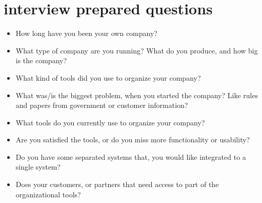 \section{interview prepared questions}

\begin{itemize}
  \item How long have you been your own company?
  \item What type of company are you running? What do you produce, and how big is the company? 
  \item What kind of tools did you use to organize your company?
  \item What was/is the biggest problem, when you started the company? Like rules and papers from government or customer information?
  \item What tools do you currently use to organize your company?
  \item Are you satisfied the tools, or do you miss more functionality or usability?
  \item Do you have some separated systems that, you would like integrated to a single system?
  \item Does your customers, or partners that need access to part of the organizational tools?
\end{itemize}